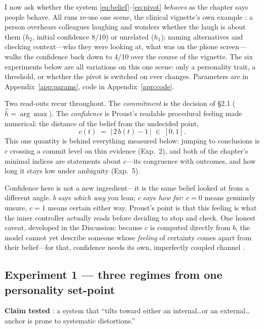 \documentclass[11pt]{article}
\begin{document}
I now ask whether the system \eqref{eq:belief}--\eqref{eq:pivot} \emph{behaves} as the chapter says people behave. All runs re-use one scene, the clinical vignette's own example \citep[p.~12]{HanEtAL2025}: a person overhears colleagues laughing and wonders whether the laugh is about them ($h_2$, initial confidence 8/10) or unrelated ($h_1$); naming alternatives and checking context---who they were looking at, what was on the phone screen---walks the confidence back down to 4/10 over the course of the vignette. The six experiments below are all variations on this one scene: only a personality trait, a threshold, or whether the pivot is switched on ever changes. Parameters are in Appendix~\ref{app:params}, code in Appendix~\ref{app:code}.

Two read-outs recur throughout. The \emph{commitment} is the decision of \S2.1 ($\hat h = \arg\max$). The \emph{confidence} is Proust's readable procedural feeling \citep[p.~3]{HanEtAL2025} made numerical: the distance of the belief from the undecided point,
\begin{equation}
c(t) \;=\; \big|\,2\,b(t)-1\,\big| \;\in\;[0,1].
\label{eq:conf}
\end{equation}
This one quantity is behind everything measured below: jumping to conclusions is $c$ crossing a commit level on thin evidence (Exp.~2), and both of the chapter's minimal indices are statements about $c$---its congruence with outcomes, and how long it stays low under ambiguity (Exp.~5).

\begin{plainbox}
Confidence here is not a new ingredient---it is the same belief looked at from a different angle. $b$ says \emph{which way} you lean; $c$ says \emph{how far}: $c=0$ means genuinely unsure, $c=1$ means certain either way. Proust's point is that this feeling is what the inner controller actually reads before deciding to stop and check. One honest caveat, developed in the Discussion: because $c$ is computed directly from $b$, the model cannot yet describe someone whose \emph{feeling} of certainty comes apart from their belief---for that, confidence needs its own, imperfectly coupled channel \citep{FlemingDaw2017}.
\end{plainbox}

\subsection{Experiment 1 --- three regimes from one personality set-point}
\textbf{Claim tested} \citep[p.~7]{HanEtAL2025}: a system that ``tilts toward either an internal\dots or an external\dots anchor is prone to systematic distortions.''
\end{document}
